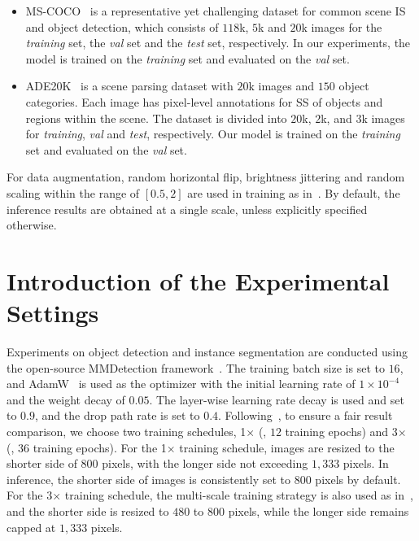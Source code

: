 \begin{itemize}
\item MS-COCO~\citep{caesar2018coco} is a representative yet challenging dataset for common scene IS and object detection, which consists of $118$k, $5$k and $20$k images for the \emph{training} set, the \emph{val} set and the \emph{test} set, respectively. In our experiments, the model is trained on the \emph{training} set and evaluated on the \emph{val} set.
\item ADE20K~\citep{zhou2017scene} is a scene parsing dataset with $20$k images and $150$ object categories. Each image has pixel-level annotations for SS of objects and regions within the scene. The dataset is divided into $20$k, $2$k, and $3$k images for \emph{training}, \emph{val} and \emph{test}, respectively. Our model is trained on the \emph{training} set and evaluated on the \emph{val} set.
\end{itemize}
For data augmentation, random horizontal flip, brightness jittering and random scaling within the range of $[0.5, 2]$ are used in training as in~\citep{chen2022vision,luo2023forgery,zhang2023cae,mercea2024time}. By default, the inference results are obtained at a single scale, unless explicitly specified otherwise.    


\section{Introduction of the Experimental Settings}
\label{secS3}
{} Experiments on object detection and instance segmentation are conducted using the open-source MMDetection framework~\citep{chen2019mmdetection}. The training batch size is set to $16$, and AdamW~\citep{loshchilov2017decoupled} is used as the optimizer with the initial learning rate of $1 \times 10^{-4}$ and the weight decay of $0.05$. The layer-wise learning rate decay is used and set to $0.9$, and the drop path rate is set to $0.4$. Following~\citep{xiong2024efficient,wang2021pyramid,chen2022vision,liu2022convnet}, to ensure a fair result comparison, we choose two training schedules, 1$\times$ (\ie, $12$ training epochs) and 3$\times$ (\ie, $36$ training epochs). For the 1$\times$ training schedule, images are resized to the shorter side of 800 pixels, with the longer side not exceeding $1,333$ pixels. In inference, the shorter side of images is consistently set to 800 pixels by default. For the 3$\times$ training schedule, the multi-scale training strategy is also used as in~\citep{chen2022vision}, and the shorter side is resized to $480$ to $800$ pixels, while the longer side remains capped at $1,333$ pixels.

